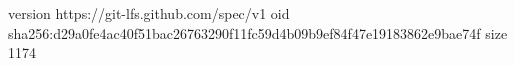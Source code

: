 version https://git-lfs.github.com/spec/v1
oid sha256:d29a0fe4ac40f51bac26763290f11fc59d4b09b9ef84f47e19183862e9bae74f
size 1174
